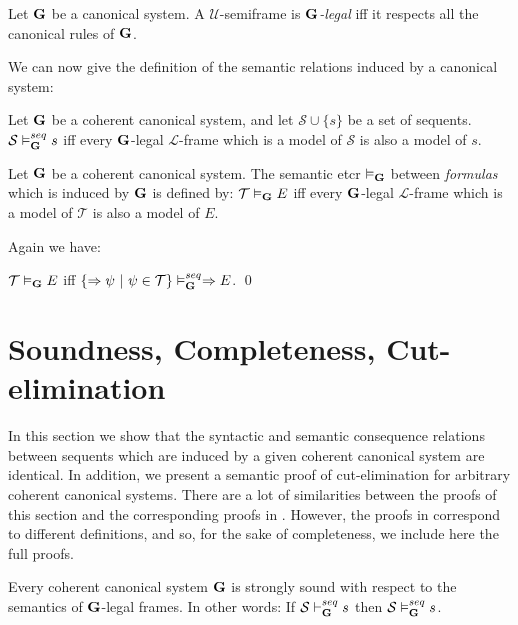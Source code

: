 \documentclass{LMCS}
\theoremstyle{remark}
\newcommand{\lp}{\mathcal{L}}
\newcommand{\Ss}{\mathcal{S}}
\newcommand{\T}{\mathcal{T}}
\newcommand{\U}{\mathcal{U}}
\newcommand{\G}{{\bf G}}
\newcommand{\Ra}{\Rightarrow}
\newcommand{\vd}{\vdash}
\newcommand{\vD}{\vDash}
\newcommand{\st}{{\ |\ }}   \newcommand{\til}{,\dots,}
\begin{document}
\begin{defi}
\label{G-legal}
Let ${\G}$ be a canonical system.
A $\U$-semiframe is {\em ${\G}$-legal} iff it respects all the canonical rules of ${\G}$.
\end{defi}

\indent
We can now give the definition of the semantic relations induced by a canonical system:

\begin{defi}
Let ${\G}$ be a coherent canonical system,
and let $\Ss \cup \{s\}$ be a set of sequents.
${\Ss\vD_\G^{seq} s}$ iff every ${\G}$-legal $\lp$-frame which is
a model of $\Ss$ is also a model of ${s}$.
\end{defi}

\begin{defi}
Let ${\G}$ be a coherent canonical system. 
The semantic etcr $\vD_\G$ between {\em formulas}
which is induced by ${\G}$ is defined by:
$\T\vD_\G E$ iff every ${\G}$-legal $\lp$-frame which is 
a model of $\T$ is also a model of $E$.
\end{defi}

\noindent
Again we have:

\begin{prop}
\label{reduction2}
$\T\vD_{\G} E$ iff $\{\Ra\psi\st\psi\in\T\}\vD_{\G}^{seq}\Ra E$.
\qed
\end{prop}


\section{Soundness, Completeness, Cut-elimination}
In this section we show that the syntactic and semantic consequence relations between sequents
which are induced by a given coherent canonical system are identical.
In addition, we present a semantic proof of cut-elimination for arbitrary coherent canonical systems.
There are a lot of similarities between the proofs of this section and the corresponding proofs in 
\cite{AL10}. However, the proofs in \cite{AL10} correspond to different definitions,
and so, for the sake of completeness, we include here the full proofs.

\begin{thm}
\label{soundness}
Every coherent canonical system ${\G}$
is strongly sound with respect to the semantics
of ${\G}$-legal frames. In other words:
If $\Ss\vd_{\G}^{seq}s$ then $\Ss\vD_{\G}^{seq}s$.
\end{thm}
\end{document}
